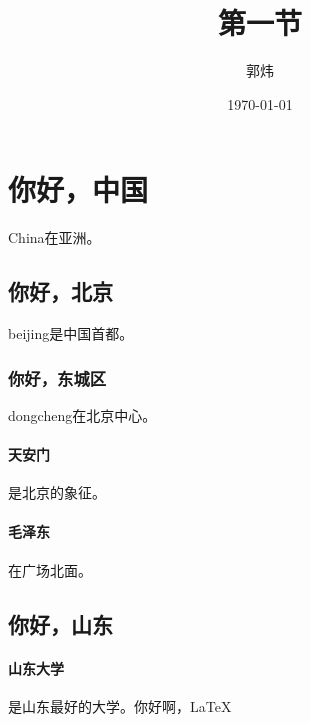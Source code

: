 \documentclass[UTF8]{ctexart}
\title{第一节}
\author{郭炜}
\date{\today}
\begin{document}
    \maketitle
    \tableofcontents
    \section{你好，中国}
    China在亚洲。
    \subsection{你好，北京}
    beijing是中国首都。
    \subsubsection{你好，东城区}
    dongcheng在北京中心。
    \paragraph{天安门}是北京的象征。
    \paragraph{毛泽东}在广场北面。
    \subsection{你好，山东}
    \paragraph{山东大学}是山东最好的大学。你好啊，\LaTeX
\end{document}

